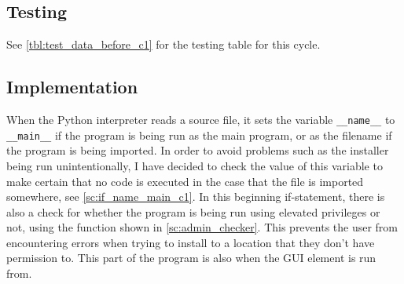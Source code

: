 \documentclass[11pt]{article}
\begin{document}
        \subsection{Testing}

            See \autoref{tbl:test_data_before_c1} for the testing table for this cycle.


        \subsection{Implementation}





            When the Python interpreter reads a source file, it sets the variable \verb|__name__| to \verb|__main__| if the program is being run as the main program, or as the filename if the program is being imported.
            In order to avoid problems such as the installer being run unintentionally, I have decided to check the value of this variable to make certain that no code is executed in the case that the file is imported somewhere, see \autoref{sc:if_name_main_c1}.
            In this beginning if-statement, there is also a check for whether the program is being run using elevated privileges or not, using the function shown in \autoref{sc:admin_checker}. 
            This prevents the user from encountering errors when trying to install to a location that they don't have permission to.
            This part of the program is also when the GUI element is run from.
\end{document}

